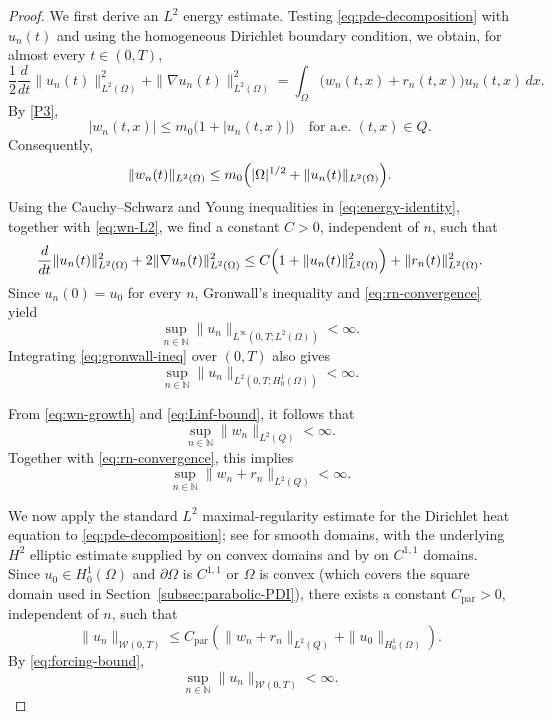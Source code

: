\documentclass[11pt]{elsarticle}
\theoremstyle{definition}
\theoremstyle{remark}
\numberwithin{equation}{section}
\begin{document}
\begin{proof}
		We first derive an $L^2$ energy estimate. Testing
		\eqref{eq:pde-decomposition} with $u_n(t)$ and using the homogeneous Dirichlet
		boundary condition, we obtain, for almost every $t\in(0,T)$,
		\begin{equation}
		\frac{1}{2}\frac{d}{dt}
		\|u_n(t)\|_{L^2(\Omega)}^2
		+
		\|\nabla u_n(t)\|_{L^2(\Omega)}^2
		=
		\int_\Omega
		\bigl(w_n(t,x)+r_n(t,x)\bigr)u_n(t,x)\,dx.
		\label{eq:energy-identity}
		\end{equation}
		By \ref{P3},
		\begin{equation}
		|w_n(t,x)|
		\leq m_0\bigl(1+|u_n(t,x)|\bigr)
		\quad\text{for a.e. }(t,x)\in Q.
		\label{eq:wn-growth}
		\end{equation}
		Consequently,
		\begin{equation}
		\|w_n(t)\|_{L^2(\Omega)}
		\leq
		m_0\Bigl(
		|\Omega|^{1/2}
		+
		\|u_n(t)\|_{L^2(\Omega)}
		\Bigr).
		\label{eq:wn-L2}
		\end{equation}
		Using the Cauchy--Schwarz and Young inequalities in
		\eqref{eq:energy-identity}, together with \eqref{eq:wn-L2}, we find a constant
		$C>0$, independent of $n$, such that
		\begin{equation}
		\frac{d}{dt}
		\|u_n(t)\|_{L^2(\Omega)}^2
		+
		2\|\nabla u_n(t)\|_{L^2(\Omega)}^2
		\leq
		C\Bigl(
		1+\|u_n(t)\|_{L^2(\Omega)}^2
		\Bigr)
		+
		\|r_n(t)\|_{L^2(\Omega)}^2.
		\label{eq:gronwall-ineq}
		\end{equation}
		Since $u_n(0)=u_0$ for every $n$, Gronwall's inequality and
		\eqref{eq:rn-convergence} yield
		\begin{equation}
		\sup_{n\in\mathbb{N}}
		\|u_n\|_{L^\infty(0,T;L^2(\Omega))}
		<\infty.
		\label{eq:Linf-bound}
		\end{equation}
		Integrating \eqref{eq:gronwall-ineq} over $(0,T)$ also gives
		\[
		\sup_{n\in\mathbb{N}}
		\|u_n\|_{L^2(0,T;H_0^1(\Omega))}
		<\infty.
		\]
		
		From \eqref{eq:wn-growth} and \eqref{eq:Linf-bound}, it follows that
		\[
		\sup_{n\in\mathbb{N}}
		\|w_n\|_{L^2(Q)}
		<\infty.		
		\]
		Together with \eqref{eq:rn-convergence}, this implies
		\begin{equation}
		\sup_{n\in\mathbb{N}}
		\|w_n+r_n\|_{L^2(Q)}
		<\infty.
		\label{eq:forcing-bound}
		\end{equation}
		
		We now apply the standard $L^2$ maximal-regularity estimate for the
		Di\-richlet heat equation to \eqref{eq:pde-decomposition}; see
		\cite[Section~7.1.3, Theorem~5]{Evans} for smooth domains, with the
		underlying $H^2$ elliptic estimate supplied by
		\cite[Theorem~3.2.1.2]{Grisvard1985} on convex domains and by
		\cite[Theorem~2.4.2.5]{Grisvard1985} on $C^{1,1}$ domains. Since
		$u_0\in H_0^1(\Omega)$ and $\partial\Omega$ is $C^{1,1}$ or $\Omega$ is convex (which covers the square domain used in Section~\ref{subsec:parabolic-PDI}), there exists a constant
		$C_{\mathrm{par}}>0$, independent of $n$, such that
		\[
		\|u_n\|_{\mathcal{W}(0,T)}
		\leq
		C_{\mathrm{par}}
		\left(
		\|w_n+r_n\|_{L^2(Q)}
		+
		\|u_0\|_{H_0^1(\Omega)}
		\right).
		\]
		By \eqref{eq:forcing-bound},
		\[
		\sup_{n\in\mathbb{N}}
		\|u_n\|_{\mathcal{W}(0,T)}
		<\infty.
		\]
		

\end{proof}
\end{document}
